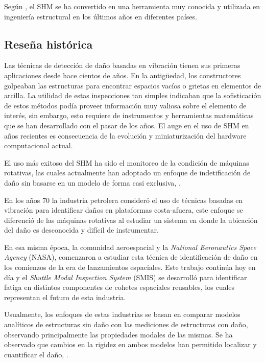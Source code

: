 Según \citet{enckell2006structural}, el SHM se ha convertido en una herramienta muy conocida y utilizada en ingeniería estructural en los últimos años en diferentes países.

\subsection{Reseña histórica}

Las técnicas de detección de daño basadas en vibración tienen sus primeras aplicaciones desde hace cientos de años. En la antigüedad, los constructores golpeaban las estructuras para encontrar espacios vacíos o grietas en elementos de arcilla. La utilidad de estas inspecciones tan simples indicaban que la sofisticación de estos métodos podía proveer información muy valiosa sobre el elemento de interés, sin embargo, esto requiere de instrumentos y herramientas matemáticas que se han desarrollado con el pasar de los años. El auge en el uso de SHM en años recientes es consecuencia de la evolución y miniaturización del hardware computacional actual.


El uso más exitoso del SHM ha sido el monitoreo de la condición de máquinas rotativas, las cuales actualmente han adoptado un enfoque de indetificación de daño sin basarse en un modelo de forma casi exclusiva, \citep{farrar2007introduction}.

En los años 70 la industria petrolera consideró el uso de técnicas basadas en vibración para identificar daños en plataformas costa-afuera, este enfoque se diferenció de las máquinas rotativas al estudiar un sistema en donde la ubicación del daño es desconocida y difícil de instrumentar.

En esa misma época, la comunidad aeroespacial y la \textit{National Eeronautics Space Agency} (NASA), comenzaron a estudiar esta técnica de identificación de daño en los comienzos de la era de lanzamientos espaciales. Este trabajo continúa hoy en día y el \textit{Shuttle Modal Inspection System} (SMIS) se desarrolló para identificar fatiga en distintos componentes de cohetes espaciales reusables, los cuales representan el futuro de esta industria.


Usualmente, los enfoques de estas industrias se basan en comparar modelos analíticos de estructuras sin daño con las mediciones de estructuras con daño, observando principalmente las propiedades modales de las mismas. Se ha observado que cambios en la rigidez en ambos modelos han permitido localizar y cuantificar el daño, \citep{farrar2007introduction}.

